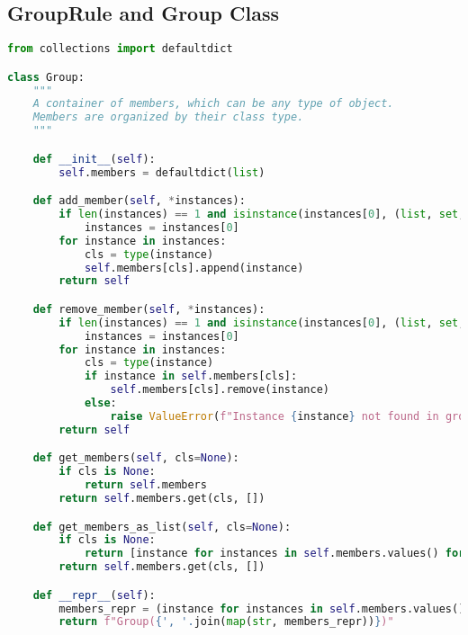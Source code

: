 

\begin{apendicesenv}


\chapter{GroupRule and Group Class}
\label{app:group_source_code}

\begin{lstlisting}[language=Python, caption={GroupRule and Group Class Source Code}]
from collections import defaultdict

class Group:
    """
    A container of members, which can be any type of object.
    Members are organized by their class type.
    """

    def __init__(self):
        self.members = defaultdict(list)

    def add_member(self, *instances):
        if len(instances) == 1 and isinstance(instances[0], (list, set, tuple)):
            instances = instances[0]
        for instance in instances:
            cls = type(instance)
            self.members[cls].append(instance)
        return self

    def remove_member(self, *instances):
        if len(instances) == 1 and isinstance(instances[0], (list, set, tuple)):
            instances = instances[0]
        for instance in instances:
            cls = type(instance)
            if instance in self.members[cls]:
                self.members[cls].remove(instance)
            else:
                raise ValueError(f"Instance {instance} not found in group.")
        return self

    def get_members(self, cls=None):
        if cls is None:
            return self.members
        return self.members.get(cls, [])

    def get_members_as_list(self, cls=None):
        if cls is None:
            return [instance for instances in self.members.values() for instance in instances]
        return self.members.get(cls, [])

    def __repr__(self):
        members_repr = (instance for instances in self.members.values() for instance in instances)
        return f"Group({', '.join(map(str, members_repr))})"


\end{lstlisting}
\end{apendicesenv}

